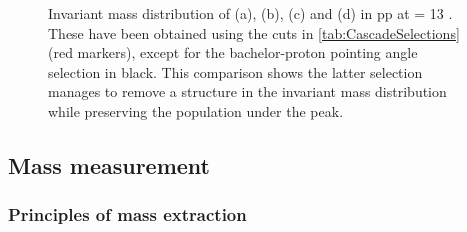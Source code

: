 \begin{figure}[t]
\hspace*{-2.cm}
	\caption{Invariant mass distribution of \rmXiM (a), \rmAxiP (b), \rmOmegaM (c) and \rmAomegaP (d) in pp at \sqrtS = 13 \tev. These have been obtained using the cuts in \tab\ref{tab:CascadeSelections} (red markers), except for the bachelor-proton pointing angle selection in black. This comparison shows the latter selection manages to remove a structure in the invariant mass distribution while preserving the population under the peak.}
	\label{fig:WrongTopology}
\end{figure}

\subsection{Mass measurement}
\label{subsec:MassExtraction}

\subsubsection{Principles of mass extraction}
\label{subsubsec:PrinciplesOfMassExtraction}

